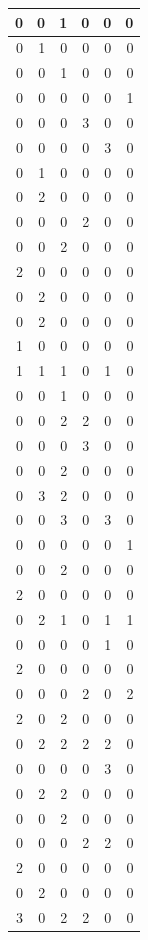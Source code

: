 \documentclass[
]{article}
\begin{document}
\begin{tabular}{r|r|r|r|r|r}
\hline
0 & 0 & 1 & 0 & 0 & 0\\
\hline
0 & 1 & 0 & 0 & 0 & 0\\
\hline
0 & 0 & 1 & 0 & 0 & 0\\
\hline
0 & 0 & 0 & 0 & 0 & 1\\
\hline
0 & 0 & 0 & 3 & 0 & 0\\
\hline
0 & 0 & 0 & 0 & 3 & 0\\
\hline
0 & 1 & 0 & 0 & 0 & 0\\
\hline
0 & 2 & 0 & 0 & 0 & 0\\
\hline
0 & 0 & 0 & 2 & 0 & 0\\
\hline
0 & 0 & 2 & 0 & 0 & 0\\
\hline
2 & 0 & 0 & 0 & 0 & 0\\
\hline
0 & 2 & 0 & 0 & 0 & 0\\
\hline
0 & 2 & 0 & 0 & 0 & 0\\
\hline
1 & 0 & 0 & 0 & 0 & 0\\
\hline
1 & 1 & 1 & 0 & 1 & 0\\
\hline
0 & 0 & 1 & 0 & 0 & 0\\
\hline
0 & 0 & 2 & 2 & 0 & 0\\
\hline
0 & 0 & 0 & 3 & 0 & 0\\
\hline
0 & 0 & 2 & 0 & 0 & 0\\
\hline
0 & 3 & 2 & 0 & 0 & 0\\
\hline
0 & 0 & 3 & 0 & 3 & 0\\
\hline
0 & 0 & 0 & 0 & 0 & 1\\
\hline
0 & 0 & 2 & 0 & 0 & 0\\
\hline
2 & 0 & 0 & 0 & 0 & 0\\
\hline
0 & 2 & 1 & 0 & 1 & 1\\
\hline
0 & 0 & 0 & 0 & 1 & 0\\
\hline
2 & 0 & 0 & 0 & 0 & 0\\
\hline
0 & 0 & 0 & 2 & 0 & 2\\
\hline
2 & 0 & 2 & 0 & 0 & 0\\
\hline
0 & 2 & 2 & 2 & 2 & 0\\
\hline
0 & 0 & 0 & 0 & 3 & 0\\
\hline
0 & 2 & 2 & 0 & 0 & 0\\
\hline
0 & 0 & 2 & 0 & 0 & 0\\
\hline
0 & 0 & 0 & 2 & 2 & 0\\
\hline
2 & 0 & 0 & 0 & 0 & 0\\
\hline
0 & 2 & 0 & 0 & 0 & 0\\
\hline
3 & 0 & 2 & 2 & 0 & 0\\

\end{tabular}
\end{document}
